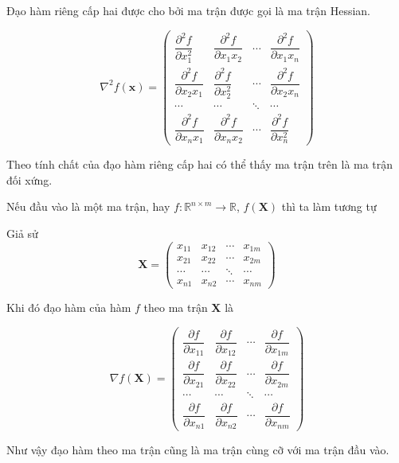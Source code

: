 \documentclass{mynotes}
\newcommand{\RR}{\mathbb{R}}
\begin{document}
Đạo hàm riêng cấp hai được cho bởi ma trận được gọi là ma trận Hessian.

\begin{equation*}
    \nabla^2 f(\bm{x}) = \begin{pmatrix}
        \dfrac{\partial^2 f}{\partial x_1^2} & \dfrac{\partial^2 f}{\partial x_1 x_2} & \cdots & \dfrac{\partial^2 f}{\partial x_1 x_n} \\ \dfrac{\partial^2 f}{\partial x_2 x_1} & \dfrac{\partial^2 f}{\partial x_2^2} & \cdots & \dfrac{\partial^2 f}{\partial x_2 x_n} \\ \cdots & \cdots & \ddots & \cdots \\ \dfrac{\partial^2 f}{\partial x_n x_1} & \dfrac{\partial^2 f}{\partial x_n x_2} & \cdots & \dfrac{\partial^2 f}{\partial x_n^2}
    \end{pmatrix}
\end{equation*}

Theo tính chất của đạo hàm riêng cấp hai có thể thấy ma trận trên là ma trận đối xứng.

Nếu đầu vào là một ma trận, hay $f: \RR^{n \times m} \to \RR$, $f(\bm{X})$ thì ta làm tương tự

Giả sử \[ \bm{X} = \begin{pmatrix}
    x_{11} & x_{12} & \cdots & x_{1m} \\ x_{21} & x_{22} & \cdots & x_{2m} \\ \cdots & \cdots & \ddots & \cdots \\ x_{n1} & x_{n2} & \cdots & x_{nm}
\end{pmatrix} \]

Khi đó đạo hàm của hàm $f$ theo ma trận $\bm{X}$ là

\begin{equation*}
    \nabla f(\bm{X}) = \begin{pmatrix}
        \dfrac{\partial f}{\partial x_{11}} & \dfrac{\partial f}{\partial x_{12}} & \cdots & \dfrac{\partial f}{\partial x_{1m}} \\ \dfrac{\partial f}{\partial x_{21}} & \dfrac{\partial f}{\partial x_{22}} & \cdots & \dfrac{\partial f}{\partial x_{2m}} \\ \cdots & \cdots & \ddots & \cdots \\ \dfrac{\partial f}{\partial x_{n1}} & \dfrac{\partial f}{\partial x_{n2}} & \cdots & \dfrac{\partial f}{\partial x_{nm}}
    \end{pmatrix}
\end{equation*}

Như vậy đạo hàm theo ma trận cũng là ma trận cùng cỡ với ma trận đầu vào.
\end{document}
